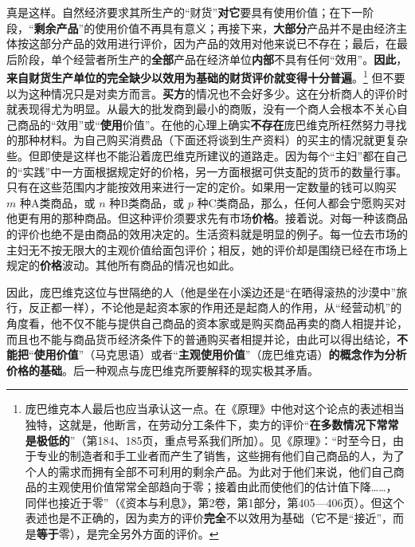 \documentclass[fontset=fandol, a4paper, 12pt, openright]{ctexbook}
\begin{document}
真是这样。自然经济要求其所生产的“财货”\textbf{对它}要具有使用价值；在下一阶段，“\textbf{剩余产品}”的使用价值不再具有意义；再接下来，\textbf{大部分}产品并不是由经济主体按这部分产品的效用进行评价，因为产品的效用对他来说已不存在；最后，在最后阶段，单个经营者所生产的\textbf{全部}产品在经济单位\textbf{内部}不具有任何“效用”。\textbf{因此}，\textbf{来自财货生产单位的完全缺少以效用为基础的财货评价就变得十分普遍}。\footnote{庞巴维克本人最后也应当承认这一点。在《原理》中他对这个论点的表述相当独特，这就是，他断言，在劳动分工条件下，卖方的评价“\textbf{在多数情况下常常是极低的}”（第184、185页，重点号系我们所加）。见《原理》：“时至今日，由于专业的制造者和手工业者而产生了销售，这些拥有他们自己商品的人，为了个人的需求而拥有全部不可利用的剩余产品。为此对于他们来说，他们自己商品的主观使用价值常常全部趋向于零；接着由此而使他们的估计值下降……，同伴也接近于零”（《资本与利息》，第2卷，第1部分，第405—406页）。但这个表述也是不正确的，因为卖方的评价\textbf{完全}不以效用为基础（它不是“接近”，而是\textbf{等于}零），是完全另外方面的评价。} 但不要以为这种情况只是对卖方而言。\textbf{买方}的情况也不会好多少。这在分析商人的评价时就表现得尤为明显。从最大的批发商到最小的商贩，没有一个商人会根本不关心自己商品的“效用”或“\textbf{使用}价值”。在他的心理上确实\textbf{不存在}庞巴维克所枉然努力寻找的那种材料。为自己购买消费品（下面还将谈到生产资料）的买主的情况就更复杂些。但即使是这样也不能沿着庞巴维克所建议的道路走。因为每个“主妇”都在自己的“实践”中一方面根据规定好的价格，另一方面根据可供支配的货币的数量行事。只有在这些范围内才能按效用来进行一定的定价。如果用一定数量的钱可以购买 $m$ 种A类商品，或 $n$ 种B类商品，或 $p$ 种C类商品，那么，任何人都会宁愿购买对他更有用的那种商品。但这种评价须要求先有市场\textbf{价格}。接着说。对每一种该商品的评价也绝不是由商品的效用决定的。生活资料就是明显的例子。每一位去市场的主妇无不按无限大的主观价值给面包评价；相反，她的评价却是围绕已经在市场上规定的\textbf{价格}波动。其他所有商品的情况也如此。

因此，庞巴维克这位与世隔绝的人（他是坐在小溪边还是“在晒得滚热的沙漠中”旅行，反正都一样），不论他是起资本家的作用还是起商人的作用，从“经营动机”的角度看，他不仅不能与提供自己商品的资本家或是购买商品再卖的商人相提并论，而且也不能与商品货币经济条件下的普通购买者相提并论，由此可以得出结论，\textbf{不能把}“\textbf{使用价值}”（马克思语）或者“\textbf{主观使用价值}”（庞巴维克语）\textbf{的概念作为分析价格的基础}。后一种观点与庞巴维克所要解释的现实极其矛盾。
\end{document}

